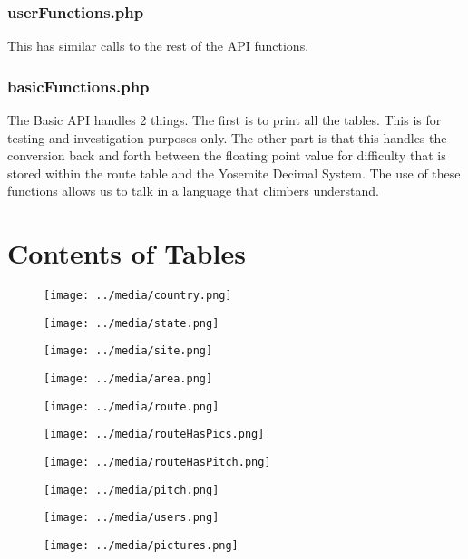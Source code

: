\documentclass[12pt,letter]{article}
\begin{document}
\subsubsection{userFunctions.php}
This has similar calls to the rest of the API functions. 

\subsubsection{basicFunctions.php}
The Basic API handles 2 things. The first is to print all the tables. This is
for testing and investigation purposes only. The other part is that this handles
the conversion back and forth between the floating point value for difficulty
that is stored within the route table and the Yosemite Decimal System. The use
of these functions allows us to talk in a language that climbers understand.

\section{Contents of Tables}\label{sec:cot}
\FloatBarrier

\begin{figure}[ht]
\texttt{[image: ../media/country.png]}
\end{figure}
%
\begin{figure}[ht]
\texttt{[image: ../media/state.png]}
\end{figure}
%
\begin{figure}[ht]
\texttt{[image: ../media/site.png]}
\end{figure}
%
\begin{figure}[ht]
\texttt{[image: ../media/area.png]}
\end{figure}
%
\begin{figure}[ht]
\texttt{[image: ../media/route.png]}
\end{figure}
%
\begin{figure}[ht]
\texttt{[image: ../media/routeHasPics.png]}
\end{figure}
%
\begin{figure}[ht]
\texttt{[image: ../media/routeHasPitch.png]}
\end{figure}
%
\begin{figure}[ht]
\texttt{[image: ../media/pitch.png]}
\end{figure}
%
\begin{figure}[ht]
\texttt{[image: ../media/users.png]}
\end{figure}
%
\begin{figure}[ht]
\texttt{[image: ../media/pictures.png]}
\end{figure}
\FloatBarrier
\end{document}
